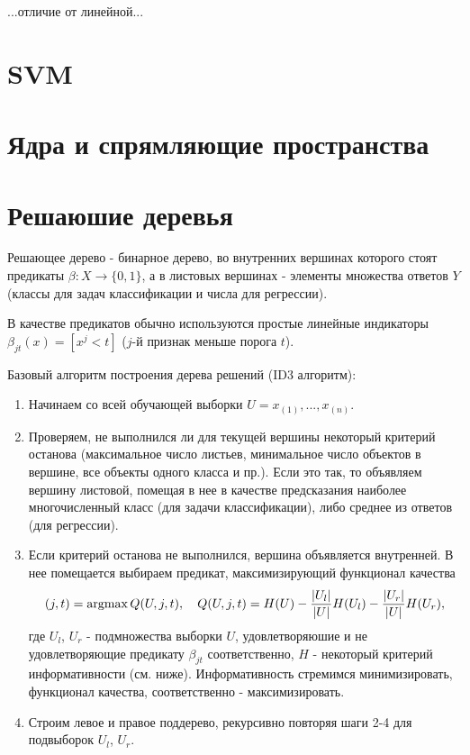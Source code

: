 ...отличие от линейной...


\section{SVM}


\section{Ядра и спрямляющие пространства}


\section{Решаюшие деревья}

Решающее дерево - бинарное дерево, во внутренних вершинах которого стоят предикаты $\beta: X \rightarrow \{0, 1\}$, а в листовых вершинах - элементы множества ответов $Y$ (классы для задач классификации и числа для регрессии).

В качестве предикатов обычно используются простые линейные индикаторы $\beta_{jt}(x) = [x^j < t]$ ($j$-й признак меньше порога $t$).

Базовый алгоритм построения дерева решений (ID3 алгоритм):

\begin{enumerate}
    \item Начинаем со всей обучающей выборки $U = x_{(1)}, ..., x_{(n)}$.
    \item Проверяем, не выполнился ли для текущей вершины некоторый критерий останова (максимальное число листьев, минимальное число объектов в вершине, все объекты одного класса и пр.). Если это так, то объявляем вершину листовой, помещая в нее в качестве предсказания наиболее многочисленный класс (для задачи классификации), либо среднее из ответов (для регрессии).
    \item Если критерий останова не выполнился, вершина объявляется внутренней. В нее помещается выбираем предикат, максимизирующий функционал качества
$$
(j,t) = \operatorname*{argmax} Q(U, j, t), \quad Q(U, j, t) = H(U) - \frac{|U_l|}{|U|}H(U_l) - \frac{|U_r|}{|U|}H(U_r),
$$
где $U_l$, $U_r$ - подмножества выборки $U$, удовлетворяюшие и не удовлетворяющие предикату $\beta_{jt}$ соответственно, $H$ - некоторый критерий информативности (см. ниже). Информативность стремимся минимизировать, функционал качества, соответственно - максимизировать.
    \item Строим левое и правое поддерево, рекурсивно повторяя шаги 2-4 для подвыборок $U_l$, $U_r$.
\end{enumerate}

